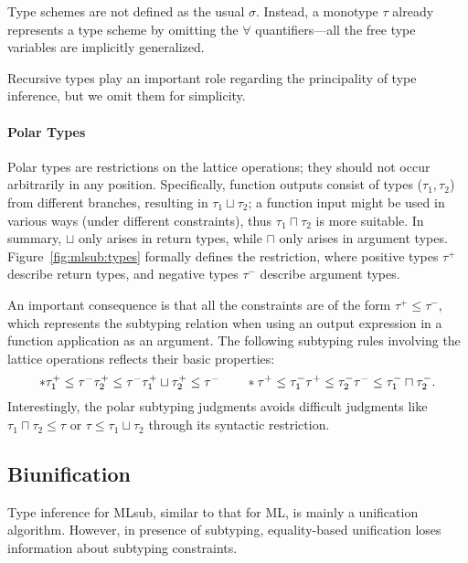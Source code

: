 Type schemes are not defined as the usual $\sigma$.
Instead, a monotype $\tau$ already represents a type scheme by
omitting the $\forall$ quantifiers---all the
free type variables are implicitly generalized.

Recursive types play an important role regarding the principality of type inference,
but we omit them for simplicity.

\paragraph{Polar Types}
Polar types are restrictions on the lattice operations;
they should not occur arbitrarily in any position.
Specifically, function outputs consist of types ($\tau_1, \tau_2$) from different branches,
resulting in $\tau_1 \sqcup \tau_2$;
a function input might be used in various ways (under different constraints),
thus $\tau_1 \sqcap \tau_2$ is more suitable.
In summary, $\sqcup$ only arises in return types,
while $\sqcap$ only arises in argument types.
Figure~\ref{fig:mlsub:types} formally defines the restriction,
where positive types $\tau^+$ describe return types,
and negative types $\tau^-$ describe argument types.

An important consequence is that all the constraints are of the form
$\tau^+ \le \tau^-$, which represents the subtyping relation when
using an output expression in a function application as an argument.
The following subtyping rules involving the lattice operations
reflects their basic properties:
\[
    *
        {\tau_1^+ \le \tau^- \\ \tau_2^+ \le \tau^-}
        {\tau_1^+ \sqcup \tau_2^+ \le \tau^-}
    \qquad
    *
        {\tau^+ \le \tau_1^- \\ \tau^+ \le \tau_2^-}
        {\tau^- \le \tau_1^- \sqcap \tau_2^-}
    .
\]
Interestingly, the polar subtyping judgments avoids difficult judgments like
$\tau_1 \sqcap \tau_2 \le \tau$ or $\tau \le \tau_1 \sqcup \tau_2$
through its syntactic restriction.



\subsection{Biunification}

Type inference for MLsub, similar to that for ML, is mainly a unification algorithm.
However, in presence of subtyping,
equality-based unification loses information about subtyping constraints.

